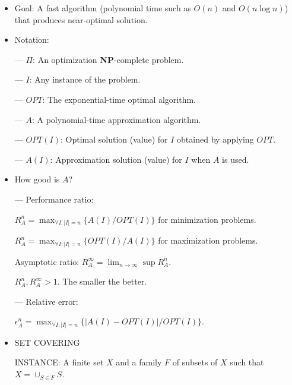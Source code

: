 \documentclass{article}
\begin{document}
\begin{itemize}
\item Goal: A fast algorithm (polynomial time such as $O(n)$ and
$O(n\log n)$) that produces near-optimal solution.

\item Notation:

--- $\Pi$: An optimization {\bf NP}-complete problem.
                                                                                
--- $I$: Any instance of the problem.
                                                              
--- $OPT$: The exponential-time optimal algorithm.
                                                                                
--- $A$: A polynomial-time approximation algorithm.
                                                                                
--- $OPT(I)$: Optimal solution (value) for $I$ obtained by applying $OPT$.

--- $A(I)$: Approximation solution (value) for $I$ when $A$ is used.
	
\item How good is $A$?
                                                                          
--- Performance ratio:
                                                                               
\qquad $R_A^n=\max_{\forall I: |I|=n}\{A(I)/OPT(I)\}$ for minimization problems.

\qquad $R_A^n=\max_{\forall I: |I|=n}\{OPT(I)/A(I)\}$ for maximization problems.

\qquad Asymptotic ratio: $R_A^\infty=\lim_{n\to\infty}\sup R_A^n$.
                                                                                
\qquad $R_A^n, R_A^\infty>1$. The smaller the better.
                                                                               
--- Relative error:

\qquad $\epsilon_A^n=\max_{\forall I: |I|=n}\{|A(I)-OPT(I)|/OPT(I)\}$.
	
\item SET COVERING
                                                               
INSTANCE: A finite set $X$ and a family $F$ of subsets of $X$ such that
$X=\cup_{S\in F}S$.
                                                                               

\end{itemize}
\end{document}
